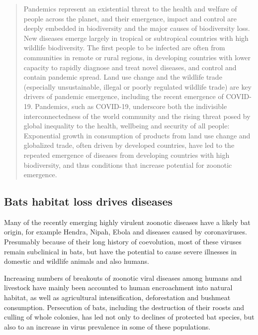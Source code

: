 \documentclass[
]{book}
\begin{document}
\begin{quote}
Pandemics represent an existential threat to the health and welfare of people across the planet, and their emergence, impact and control are deeply embedded in biodiversity and the major causes of biodiversity loss. New diseases emerge largely in tropical or subtropical countries with high wildlife biodiversity. The first people to be infected are often from communities in remote or rural regions, in developing countries with lower capacity to rapidly diagnose and treat novel diseases, and control and contain pandemic spread. Land use change and the wildlife trade (especially unsustainable, illegal or poorly regulated wildlife trade) are key drivers of pandemic emergence, including the recent emergence of COVID-19. Pandemics, such as COVID-19, underscore both the indivisible interconnectedness of the world community and the rising threat posed by global inequality to the health, wellbeing and security of all people: Exponential growth in consumption of products from land use change and globalized trade, often driven by developed countries, have led to the repeated emergence of diseases from developing countries with high biodiversity, and thus conditions that increase potential for zoonotic emergence.
\end{quote}

\hypertarget{bats-habitat-loss-drives-diseases}{%
\subsection{Bats habitat loss drives diseases}\label{bats-habitat-loss-drives-diseases}}

Many of the recently emerging highly virulent zoonotic diseases have a
likely bat origin, for example Hendra, Nipah, Ebola and diseases caused
by coronaviruses.
Presumably because of their long history of coevolution, most of these
viruses remain subclinical in bats,
but have the potential to cause severe illnesses
in domestic and wildlife animals and also humans.

Increasing numbers of breakouts of zoonotic viral diseases among
humans and livestock have mainly been accounted to human encroachment
into natural habitat, as well as agricultural intensification,
deforestation and bushmeat consumption.
Persecution of bats, including the destruction of their roosts and culling of
whole colonies, has led not only to declines of protected bat species,
but also to an increase in virus prevalence in some of these populations.
\end{document}
